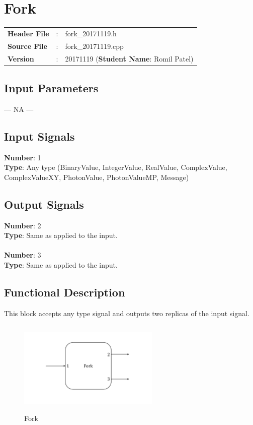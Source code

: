 \clearpage

\section{Fork}

\begin{tcolorbox}	
\begin{tabular}{p{2.75cm} p{0.2cm} p{10.5cm}} 	
\textbf{Header File}   &:& fork\_20171119.h \\
\textbf{Source File}   &:& fork\_20171119.cpp \\
\textbf{Version}       &:& 20171119 (\textbf{Student Name}: Romil Patel)
\end{tabular}
\end{tcolorbox}

\subsection*{Input Parameters}

--- NA ---

\subsection*{Input Signals}

\textbf{Number}: 1\\
\textbf{Type}: Any type (BinaryValue, IntegerValue, RealValue, ComplexValue, ComplexValueXY, PhotonValue, PhotonValueMP, Message)

\subsection*{Output Signals}

\textbf{Number}: 2\\
\textbf{Type}: Same as applied to the input.\\
\\
\textbf{Number}: 3\\
\textbf{Type}: Same as applied to the input.

\subsection*{Functional Description}

This block accepts any type signal and outputs two replicas of the input signal.

\begin{figure}[h]
	\centering
	\includegraphics[width=0.6\textwidth, height=4.5cm]{./lib/fork/figures/fork.pdf}
	\caption{Fork}\label{}
\end{figure}